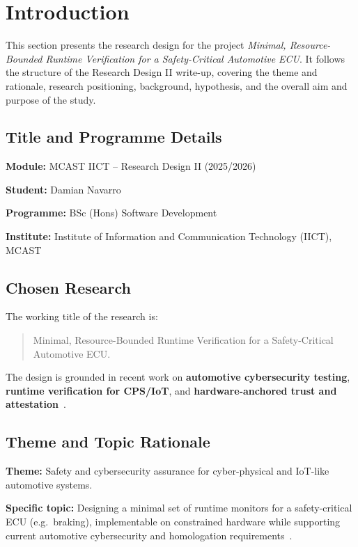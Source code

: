 \section{Introduction}
\label{sec:Int}

This section presents the research design for the project \emph{Minimal, Resource-Bounded Runtime Verification for a Safety-Critical Automotive ECU}. It follows the structure of the Research Design II write-up, covering the theme and rationale, research positioning, background, hypothesis, and the overall aim and purpose of the study.

\subsection{Title and Programme Details}

\textbf{Module:} MCAST IICT -- Research Design II (2025/2026)

\textbf{Student:} Damian Navarro

\textbf{Programme:} BSc (Hons) Software Development

\textbf{Institute:} Institute of Information and Communication Technology (IICT), MCAST

\subsection{Chosen Research}

The working title of the research is:

\begin{quote}
Minimal, Resource-Bounded Runtime Verification for a Safety-Critical Automotive ECU.
\end{quote}

The design is grounded in recent work on \textbf{automotive cybersecurity testing}, \textbf{runtime verification for CPS/IoT}, and \textbf{hardware-anchored trust and attestation}~\cite{ekert2021cybersecurity,zhang2024context,dehoz2022iotdt,plappert2023hta}.

\subsection{Theme and Topic Rationale}

\textbf{Theme:} Safety and cybersecurity assurance for cyber-physical and IoT-like automotive systems.

\textbf{Specific topic:} Designing a minimal set of runtime monitors for a safety-critical ECU (e.g.\ braking), implementable on constrained hardware while supporting current automotive cybersecurity and homologation requirements~\cite{ekert2021cybersecurity,krichen2023survey}.

